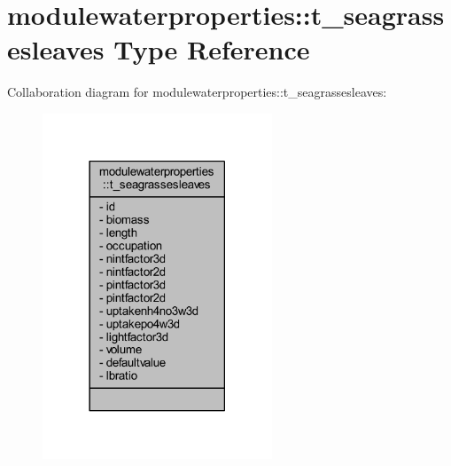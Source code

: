 \hypertarget{structmodulewaterproperties_1_1t__seagrassesleaves}{}\section{modulewaterproperties\+:\+:t\+\_\+seagrassesleaves Type Reference}
\label{structmodulewaterproperties_1_1t__seagrassesleaves}


Collaboration diagram for modulewaterproperties\+:\+:t\+\_\+seagrassesleaves\+:\nopagebreak
\begin{figure}[H]
\begin{center}
\leavevmode
\includegraphics[width=194pt]{structmodulewaterproperties_1_1t__seagrassesleaves__coll__graph}
\end{center}
\end{figure}
